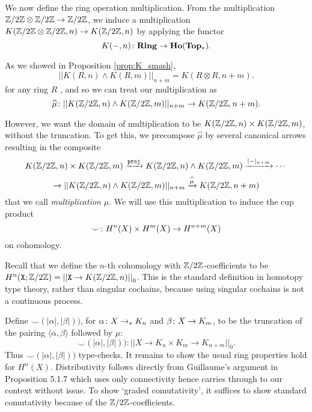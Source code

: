 \documentclass{amsart}
\begin{document}
We now define the ring operation multiplication. From the multiplication
$ \mathbb{Z}/2\mathbb{Z} \otimes \mathbb{Z}/2\mathbb{Z} \to \mathbb{Z}/2\mathbb{Z} $, we induce a multiplication
$ K(\mathbb{Z}/2\mathbb{Z} \otimes \mathbb{Z}/2\mathbb{Z}, n)\to K(\mathbb{Z}/2\mathbb{Z}, n) $ by applying the
functor
\[
K(-,n) \colon \mathbf{Ring} \to \mathbf{Ho}(\mathbf{Top_\ast}).
\]

As we showed in Proposition \ref{prop:K_smash}, 
\[
|| K(R,n) \wedge K(R,m) ||_{n+m} =
K (R \otimes R, n+m ).
\]
for any ring $ R $ , and so we can treat our multiplication as
\[
\widehat{\mu} \colon
|| K(\mathbb{Z}/2\mathbb{Z},n) \wedge K(\mathbb{Z}/2\mathbb{Z},m) ||_{n+m} \to K(\mathbb{Z}/2\mathbb{Z}, n+m).
\]


However, we want the domain of multiplication
to be $ K ( \mathbb{Z}/2\mathbb{Z} , n) \times K( \mathbb{Z}/2\mathbb{Z}, m) $, without the truncation. To get this, we
precompose $ \widehat{\mu} $ by several canonical arrows
resulting in the composite
\[
K (\mathbb{Z}/2\mathbb{Z} , n) \times K(\mathbb{Z}/2\mathbb{Z}, m)
\xrightarrow{\mathtt{proj}}
K (\mathbb{Z}/2\mathbb{Z} , n) \wedge K(\mathbb{Z}/2\mathbb{Z}, m)
\xrightarrow{|-|_{n+m}}\cdots\]
\[\rightarrow|| K (\mathbb{Z}/2\mathbb{Z} , n) \wedge K(\mathbb{Z}/2\mathbb{Z}, m) ||_{n+m}
\xrightarrow{\widehat{\mu}}
K(\mathbb{Z}/2\mathbb{Z}, n+m)
\]
that we call \emph{multiplication} $ \mu $.  We will use this multiplication to induce
the cup product
\[
\smile \colon H^n(X) \times H^m(X) \to H^{n+m}(X)
\]
on cohomology. 



Recall that we define the $ n $-th cohomology
with $ \mathbb{Z}/2\mathbb{Z} $-coefficients to be
$H^n(\mathtt{X};\mathbb{Z}/2\mathbb{Z})= \left| \left| \mathtt{X}\rightarrow K(\mathbb{Z}/2\mathbb{Z},n)\right| \right|_0$. This is the
standard definition in homotopy type theory, rather than
singular cochains, because using singular cochains is not
a continuous process. 


Define
$ \smile ( |\alpha|, |\beta|) ) $, for
$ \alpha \colon X \to_\ast K_n $ and
$ \beta \colon X \to K_m $, to be the truncation of the
pairing $ \langle \alpha, \beta \rangle $ followed by $ \mu $:
\[
\smile ( |\alpha|, |\beta|) ) :
|| X \to K_n \times K_m \to K_{n+m} ||_0.
\]
Thus $ \smile ( |\alpha|, |\beta|) ) $ type-checks. It
remains to show the usual ring properties hold for $ H^n(X)
$.  Distributivity follows directly from Guillaume's
argument in Proposition 5.1.7 which uses only connectivity
hence carries through to our context without issue.  To show
`graded comutativity', it suffices to show standard
comutativity because of the $ \mathbb{Z}/2\mathbb{Z} $-coefficients.  
\end{document}
